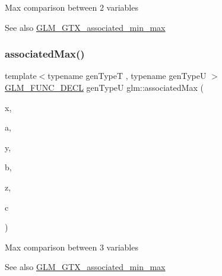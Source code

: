 Max comparison between 2 variables \begin{DoxySeeAlso}{See also}
\hyperlink{group__gtx__associated__min__max}{G\+L\+M\+\_\+\+G\+T\+X\+\_\+associated\+\_\+min\+\_\+max} 
\end{DoxySeeAlso}
\mbox{\label{group__gtx__associated__min__max_ga20218dcc769c76adf0c3e9aad21c64a4}} 
\subsubsection{\texorpdfstring{associated\+Max()}{associatedMax()}\hspace{0.1cm}{\footnotesize\ttfamily [2/3]}}
{\footnotesize\ttfamily template$<$typename gen\+TypeT , typename gen\+TypeU $>$ \\
\hyperlink{setup_8hpp_ab2d052de21a70539923e9bcbf6e83a51}{G\+L\+M\+\_\+\+F\+U\+N\+C\+\_\+\+D\+E\+CL} gen\+TypeU glm\+::associated\+Max (\begin{DoxyParamCaption}\item[{const gen\+TypeT \&}]{x,  }\item[{const gen\+TypeU \&}]{a,  }\item[{const gen\+TypeT \&}]{y,  }\item[{const gen\+TypeU \&}]{b,  }\item[{const gen\+TypeT \&}]{z,  }\item[{const gen\+TypeU \&}]{c }\end{DoxyParamCaption})}

Max comparison between 3 variables \begin{DoxySeeAlso}{See also}
\hyperlink{group__gtx__associated__min__max}{G\+L\+M\+\_\+\+G\+T\+X\+\_\+associated\+\_\+min\+\_\+max} 
\end{DoxySeeAlso}
\mbox{\label{group__gtx__associated__min__max_ga23f2bce9c1d6f775cd1f7bf36525286e}} 
